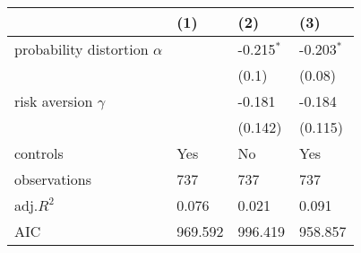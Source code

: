 \begin{tabular}{llll}
\hline
 & (1) & (2) & (3) \\
\hline
probability distortion $\alpha$ &  & -0.215$^{*}$ & -0.203$^{*}$ \\
 &  & (0.1) & (0.08) \\
risk aversion $\gamma$ &  & -0.181 & -0.184 \\
 &  & (0.142) & (0.115) \\
controls & Yes & No & Yes \\
observations & 737 & 737 & 737 \\
adj.$R^2$ & 0.076 & 0.021 & 0.091 \\
AIC & 969.592 & 996.419 & 958.857 \\
\hline
\end{tabular}
